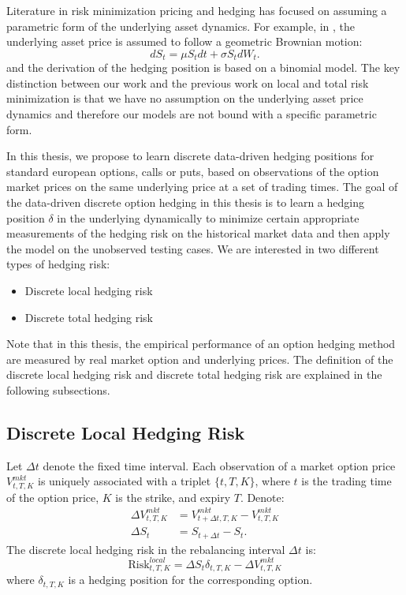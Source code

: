 \documentclass[letterpaper,12pt,titlepage,oneside,final]{book}
\numberwithin{equation}{section}
\theoremstyle{definition}
\newcommand{\DT}{\Delta t}
\newcommand{\Vmkt}{V^{mkt}}
\newcommand{\Smkt}{S}
\begin{document}
Literature in risk minimization pricing and hedging has focused on assuming a parametric form of the underlying asset dynamics. For example, in \cite{coleman2003discrete,coleman2007discrete}, the underlying asset price is assumed to follow  a geometric Brownian motion:
\[
dS_t=\mu S_t dt+\sigma S_t dW_t.
\]
and the derivation of the hedging position is based on a binomial model. The key distinction between our work and  the previous work on local and total risk minimization is that we have no assumption on the underlying asset price dynamics and therefore our models are not bound with a specific parametric form.

In this thesis, we propose to learn discrete data-driven hedging positions for standard european options, calls or puts, based on observations of the option market prices on the same underlying price at a set of trading times. The goal of the data-driven discrete option hedging in this thesis is to learn a hedging position $\delta$ in the underlying dynamically to minimize certain appropriate measurements of the hedging risk on the historical market data and then apply the model on the unobserved testing cases. We are interested in two different types of hedging risk:
\begin{itemize}
   \item  Discrete local hedging risk
   \item  Discrete total hedging risk
\end{itemize}
Note that in this thesis, the  empirical performance of an option hedging method are measured by real market option and underlying prices.
The definition of the discrete local hedging risk and discrete total hedging risk are explained in the following subsections. 

\subsection{Discrete Local Hedging Risk}
\label{sec:DiscreteLocalRisk}
 Let $\DT$ denote the fixed  time interval.
Each observation of a market option price  $V^{mkt}_{t,T,K}$ is uniquely associated with a triplet $\{t,T,K\}$, where $t$ is the trading time of the option price,  $K$ is the strike, and expiry $T$.
  Denote:
\begin{equation}
\begin{split}
\Delta V^{mkt}_{t,T,K}& =\Vmkt_{t+\Delta t,T,K}-\Vmkt_{t,T,K}\\
\Delta \Smkt_{t} &=\Smkt_{t+\DT}-\Smkt_{t}.
\end{split}
\label{eq:DVDS}
\end{equation}
The discrete local hedging risk in the rebalancing interval $\DT$ is:
\begin{equation}
	\text{Risk}^{local}_{t,T,K}=\Delta \Smkt_{t}\delta_{t,T,K} -\Delta V^{mkt}_{t,T,K}
\label{eq:local}
\end{equation}
where $\delta_{t,T,K}$ is a hedging position for the corresponding option.
\end{document}
